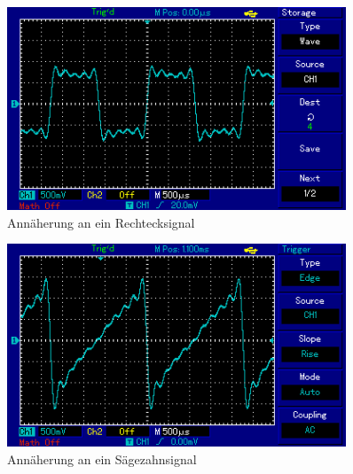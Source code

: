 \begin{figure}[h!]
	\centering
	\includegraphics[width=0.9\textwidth]{Synthese_Rechteck.png}
	\caption{Annäherung an ein Rechtecksignal}
	\label{Synthese_Rechteck}
\end{figure}


\begin{figure}[h!]
	\centering
	\includegraphics[width=0.9\textwidth]{Synthese_Saegezahn.png}
	\caption{Annäherung an ein Sägezahnsignal}
	\label{Synthese_Saege}
\end{figure}






\clearpage
